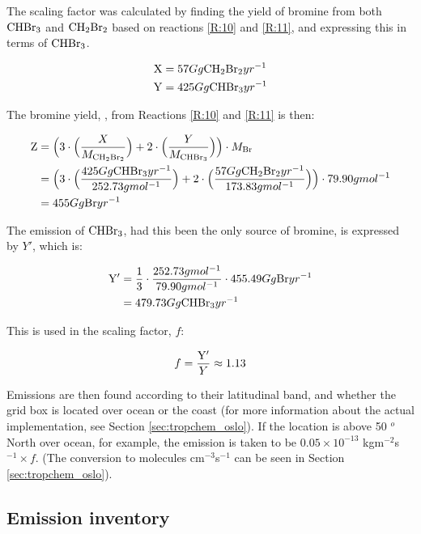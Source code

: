 \medskip

The scaling factor was calculated by finding the yield of bromine from both $\mathrm{CHBr_3}$ and $\mathrm{CH_2Br_2}$ based on reactions \ref{R:10} and \ref{R:11}, and expressing this in terms of $\mathrm{CHBr_3}$. 

\begin{align*}
    \mathrm{X} & = 57 Gg \mathrm{CH_2Br_2}yr^{-1} \\
    \mathrm{Y} & = 425 Gg \mathrm{CHBr_3}yr^{-1} 
\end{align*}

The bromine yield, , from Reactions \ref{R:10} and \ref{R:11} is then: 

\begin{align*}
    \mathrm{Z} & = \Big(3\cdot\Big(\frac{X}{M_{\mathrm{CH_2Br_2}}}\Big) + 2\cdot\Big(\frac{Y}{M_{\mathrm{CHBr_3}}}\Big)\Big)\cdot M_{\mathrm{Br}} \\
    & = \Big(3\cdot\Big(\frac{425 Gg \mathrm{CHBr_3}yr^{-1}}{252.73 g mol^{-1}}\Big) + 2\cdot\Big(\frac{57 Gg \mathrm{CH_2Br_2}yr^{-1}}{173.83 g mol^{-1}}\Big)\Big)\cdot79.90 g mol^{-1} \\
    & = 455 Gg\mathrm{Br}yr^{-1}
\end{align*}

The emission of $\mathrm{CHBr_3}$, had this been the only source of bromine, is expressed by $Y'$, which is: 

\begin{align*}
    \mathrm{Y'} & = \frac{1}{3}\cdot\frac{252.73 g mol^{-1}}{79.90 g mol^{-1}}\cdot455.49Gg\mathrm{Br}yr^{-1} \\
    & = 479.73 Gg \mathrm{CHBr_3}yr^{-1}
\end{align*}

This is used in the scaling factor, $f$:

\begin{equation*}
    f = \frac{\mathrm{Y'}}{Y} \approx 1.13
\end{equation*}


Emissions are then found according to their latitudinal band, and whether the grid box is located over ocean or the coast (for more information about the actual implementation, see Section \ref{sec:tropchem_oslo}). If the location is above 50 $^o$ North over ocean, for example, the emission is taken to be $0.05\times10^{-13}$ kgm$^{-2}$s$^{-1}\times f$. (The conversion to molecules cm$^{-3}$s$^{-1}$ can be seen in Section \ref{sec:tropchem_oslo}). 


\subsection{Emission inventory}

